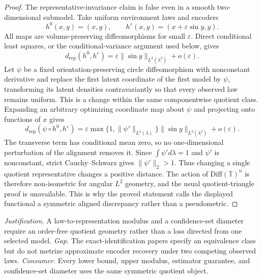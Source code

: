 \documentclass{article}
\begin{document}
\begin{proof}
The representative-invariance claim is false even in a smooth two-dimensional submodel. Take uniform environment laws and encoders
\[
h^0(x,y)=(x,y),\qquad h^\varepsilon(x,y)=(x+\varepsilon\sin y,y).
\]
All maps are volume-preserving diffeomorphisms for small \(\varepsilon\). Direct conditional least squares, or the conditional-variance argument used below, gives
\[
d_{\mathrm{rep}}(h^0,h^\varepsilon)
=\varepsilon\|\sin y\|_{L^2(\lambda^2)}+o(\varepsilon).
\]
Let \(\psi\) be a fixed orientation-preserving circle diffeomorphism with nonconstant derivative and replace the first latent coordinate of the first model by \(\psi\), transforming its latent densities contravariantly so that every observed law remains uniform. This is a change within the same componentwise quotient class. Expanding an arbitrary optimizing coordinate map about \(\psi\) and projecting onto functions of \(x\) gives
\[
d_{\mathrm{rep}}(\psi\circ h^0,h^\varepsilon)
=\varepsilon\max\{1,\|\psi'\|_{L^2(\lambda)}\}
  \|\sin y\|_{L^2(\lambda^2)}+o(\varepsilon).
\]
The transverse term has conditional mean zero, so no one-dimensional perturbation of the alignment removes it. Since \(\int\psi' d\lambda=1\) and \(\psi'\) is nonconstant, strict Cauchy--Schwarz gives \(\|\psi'\|_2>1\). Thus changing a single quotient representative changes a positive distance. The action of \(\mathrm{Diff}(\mathbb T)^n\) is therefore non-isometric for angular \(L^2\) geometry, and the usual quotient-triangle proof is unavailable. This is why the proved statement calls the displayed functional a symmetric aligned discrepancy rather than a pseudometric.
\end{proof}
\par\smallskip\noindent \textit{Justification.} A law-to-representation modulus and a confidence-set diameter require an order-free quotient geometry rather than a loss directed from one selected model. \textit{Gap.} The exact-identification papers specify an equivalence class but do not metrize approximate encoder recovery under two competing observed laws. \textit{Consumer.} Every lower bound, upper modulus, estimator guarantee, and confidence-set diameter uses the same symmetric quotient object.
\end{document}
